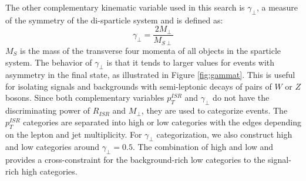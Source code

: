  The other complementary kinematic variable used in this search is $\gamma_\perp$,  a measure of the symmetry of the di-sparticle system and is defined as:
\begin{equation}
\gamma_\perp = \frac{2M_\perp}{M_{S\perp}}
\end{equation}
$M_S$ is the mass of the transverse four momenta of all objects in the sparticle system. The behavior of $\gamma_\perp$ is that it tends to larger values for events with asymmetry in the final state, as illustrated in Figure \ref{fig:gammat}. This is useful for isolating signals and backgrounds with semi-leptonic decays of pairs of $W$ or $Z$ bosons. Since both complementary variables $p_T^{ISR}$ and $\gamma_\perp$ do not have the discriminating power of $R_{ISR}$ and $M_\perp$, they are used to categorize events. The $p_T^{ISR}$ categories are separated into high or low categories with the edges depending on the lepton and jet multiplicity. For $\gamma_\perp$ categorization, we also construct high and low categories around $\gamma_\perp= 0.5$. The combination of high and low and provides a cross-constraint for the background-rich low categories to the signal-rich high categories.

  


